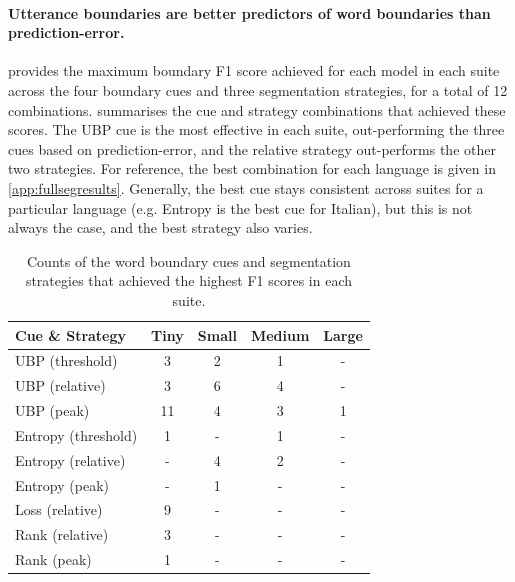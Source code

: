 \paragraph{Utterance boundaries are better predictors of word boundaries than prediction-error.}
 provides the maximum boundary F1 score achieved for each model in each suite across the four boundary cues and three segmentation strategies, for a total of 12 combinations.  summarises the cue and strategy combinations that achieved these scores. The UBP cue is the most effective in each suite, out-performing the three cues based on prediction-error, and the relative strategy out-performs the other two strategies. For reference, the best combination for each language is given in \cref{app:fullsegresults}. Generally, the best cue stays consistent across suites for a particular language (e.g. Entropy is the best cue for Italian), but this is not always the case, and the best strategy also varies. %

\begin{table}[]
    \centering
    \small
    \begin{tabular}{lcccc}
    \toprule
    Cue \& Strategy & Tiny & Small & Medium & Large \\
    \midrule
    UBP (threshold) & 3 & 2 & 1 & - \\
    UBP (relative) & 3 & 6 & 4 & - \\
    UBP (peak) & 11 & 4 & 3 & 1 \\
    Entropy (threshold) & 1 & - & 1 & - \\
    Entropy (relative) & - & 4 & 2 & - \\
    Entropy (peak) & - & 1 & - & - \\
    Loss (relative) & 9 & - & - & - \\
    Rank (relative) & 3 & - & - & - \\
    Rank (peak) & 1 & - & - & - \\
    \bottomrule
    \end{tabular}
\caption{Counts of the word boundary cues and segmentation strategies that achieved the highest F1 scores in each suite.}
\label{tab:15-bestcues}
\end{table}

